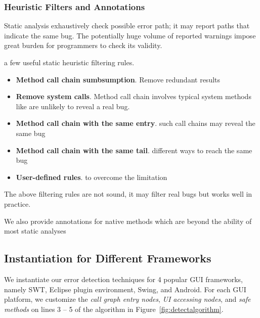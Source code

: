 \subsubsection{Heuristic Filters and Annotations}
\label{sec:heuristic}

Static analysis exhaustively check possible error path; it may report
paths that indicate the same bug. The potentially huge volume of
reported warnings impose great burden for programmers to check
its validity. 

a few useful static heuristic filtering rules.

\begin{itemize}
\item \textbf{Method call chain sumbsumption}. Remove redundant
results

\item \textbf{Remove system calls}. Method call chain involves typical
system methods like  are unlikely to reveal a real bug.

\item \textbf{Method call chain with the same entry}. such
call chains may reveal the same bug

\item \textbf{Method call chain with the same tail}.  different ways
to reach the same bug

\item \textbf{User-defined rules}.  to overcome the limitation

\end{itemize}

The above filtering rules are not sound, it may filter real bugs but works
well in practice.

We also provide annotations for native methods which are beyond the ability
of most static analyses

\subsection{Instantiation for Different Frameworks}
\label{sec:platforms}

We instantiate our error detection techniques for 4 popular GUI frameworks,
namely SWT, Eclipse plugin environment, Swing, and Android.
For each GUI platform, we customize the \textit{call graph entry nodes},
\textit{UI accessing nodes}, and \textit{safe methods} on lines 3 -- 5 of the
algorithm in Figure~\ref{fig:detectalgorithm}.



